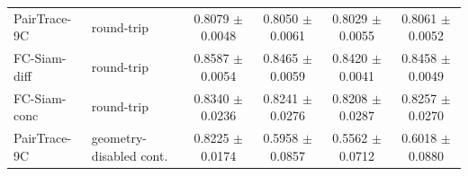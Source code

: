 \begin{table}[t]
{\begin{tabular}{llcccc}
PairTrace-9C & round-trip & 0.8079 $\pm$ 0.0048 & 0.8050 $\pm$ 0.0061 & 0.8029 $\pm$ 0.0055 & 0.8061 $\pm$ 0.0052 \\
FC-Siam-diff & round-trip & 0.8587 $\pm$ 0.0054 & 0.8465 $\pm$ 0.0059 & 0.8420 $\pm$ 0.0041 & 0.8458 $\pm$ 0.0049 \\
FC-Siam-conc & round-trip & 0.8340 $\pm$ 0.0236 & 0.8241 $\pm$ 0.0276 & 0.8208 $\pm$ 0.0287 & 0.8257 $\pm$ 0.0270 \\
PairTrace-9C & geometry-disabled cont. & 0.8225 $\pm$ 0.0174 & 0.5958 $\pm$ 0.0857 & 0.5562 $\pm$ 0.0712 & 0.6018 $\pm$ 0.0880 \\
\bottomrule
\end{tabular}
}
\end{table}
